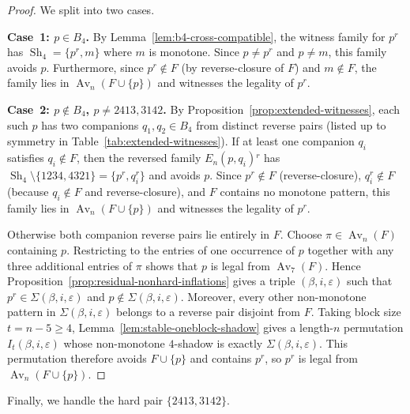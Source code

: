 \documentclass[11pt]{amsart}
\newcommand{\Av}{\operatorname{Av}}
\newcommand{\Sh}{\operatorname{Sh}}
\theoremstyle{plain}
\theoremstyle{definition}
\theoremstyle{remark}
\begin{document}
\begin{proof}
  We split into two cases.

  \medskip\noindent
  \textbf{Case~1: $p \in B_4$.}
  By Lemma~\ref{lem:b4-cross-compatible}, the witness family for $p^r$ has
  $\Sh_4 = \{p^r, m\}$ where $m$ is monotone.  Since $p \neq p^r$ and $p \neq m$,
  this family avoids $p$.  Furthermore, since $p^r \notin F$ (by reverse-closure of $F$) and
  $m \notin F$, the family lies in
  $\Av_n(F \cup \{p\})$ and witnesses the legality of $p^r$.

  \medskip\noindent
  \textbf{Case~2: $p \notin B_4$, $p \neq 2413,3142$.}
  By Proposition~\ref{prop:extended-witnesses}, each such $p$ has two companions
  $q_1, q_2 \in B_4$ from distinct reverse pairs
  (listed up to symmetry in Table~\ref{tab:extended-witnesses}).  If at least one companion $q_i$
  satisfies $q_i \notin F$,
  then the reversed family $E_n(p,q_i){}^r$ has
  $\Sh_4 \setminus \{1234,4321\} = \{p^r, q_i^r\}$ and avoids $p$.
  Since $p^r \notin F$ (reverse-closure), $q_i^r \notin F$ (because $q_i \notin F$
  and reverse-closure), and $F$ contains no monotone pattern, this family lies in
  $\Av_n(F \cup \{p\})$ and witnesses the legality of $p^r$.

  Otherwise both companion reverse pairs lie entirely in $F$.  Choose
  $\pi \in \Av_n(F)$ containing $p$.  Restricting to the entries of one occurrence of $p$ together
  with any three additional entries of $\pi$ shows that $p$ is legal from $\Av_7(F)$.  Hence
  Proposition~\ref{prop:residual-nonhard-inflations} gives a triple
  $(\beta,i,\varepsilon)$ such that $p^r \in \Sigma(\beta,i,\varepsilon)$ and
  $p \notin \Sigma(\beta,i,\varepsilon)$.  Moreover, every other non-monotone pattern in
  $\Sigma(\beta,i,\varepsilon)$ belongs to a reverse pair disjoint from $F$.
  Taking block size $t=n-5 \geq 4$, Lemma~\ref{lem:stable-oneblock-shadow} gives a length-$n$
  permutation $I_t(\beta,i,\varepsilon)$ whose non-monotone $4$-shadow is exactly
  $\Sigma(\beta,i,\varepsilon)$.  This permutation therefore avoids $F \cup \{p\}$ and contains
  $p^r$, so $p^r$ is legal from $\Av_n(F \cup \{p\})$.
\end{proof}

Finally, we handle the hard pair $\{2413,3142\}$.
\end{document}
